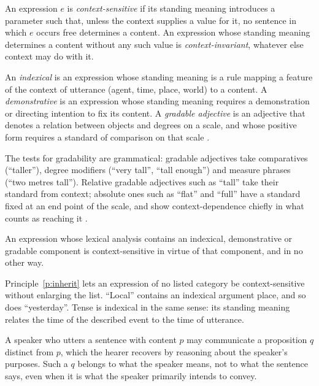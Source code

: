 \documentclass{situationist-preprint}
\begin{document}
\begin{definition}\label{d:incomplete}
An expression $e$ is \emph{context-sensitive} if its standing meaning introduces a parameter such that, unless the context supplies a value for it, no sentence in which $e$ occurs free determines a content. An expression whose standing meaning determines a content without any such value is \emph{context-invariant}, whatever else context may do with it.
\end{definition}

\begin{definition}\label{d:categories}
An \emph{indexical} is an expression whose standing meaning is a rule mapping a feature of the context of utterance (agent, time, place, world) to a content. A \emph{demonstrative} is an expression whose standing meaning requires a demonstration or directing intention to fix its content. A \emph{gradable adjective} is an adjective that denotes a relation between objects and degrees on a scale, and whose positive form requires a standard of comparison on that scale \citep{KennedyMcNally2005,Kennedy2007}.
\end{definition}

The tests for gradability are grammatical: gradable adjectives take comparatives (\enquote{taller}), degree modifiers (\enquote{very tall}, \enquote{tall enough}) and measure phrases (\enquote{two metres tall}). Relative gradable adjectives such as \enquote{tall} take their standard from context; absolute ones such as \enquote{flat} and \enquote{full} have a standard fixed at an end point of the scale, and show context-dependence chiefly in what counts as reaching it \citep{Kennedy2007}.

\begin{principle}[Inheritance]\label{p:inherit}
An expression whose lexical analysis contains an indexical, demonstrative or gradable component is context-sensitive in virtue of that component, and in no other way.
\end{principle}

Principle~\ref{p:inherit} lets an expression of no listed category be context-sensitive without enlarging the list. \enquote{Local} contains an indexical argument place, and so does \enquote{yesterday}. Tense is indexical in the same sense: its standing meaning relates the time of the described event to the time of utterance.

\begin{principle}\label{p:enrich}
A speaker who utters a sentence with content $p$ may communicate a proposition $q$ distinct from $p$, which the hearer recovers by reasoning about the speaker's purposes. Such a $q$ belongs to what the speaker means, not to what the sentence says, even when it is what the speaker primarily intends to convey.
\end{principle}
\end{document}
